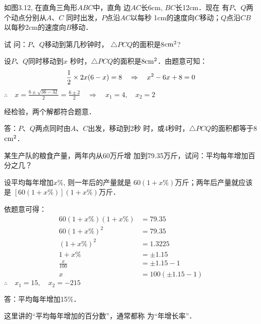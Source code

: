 \begin{example}
    如图3.12, 在直角三角形$ABC$中，直角
    边$AC$长6cm, $BC$长12cm．现在
    有$P$、$Q$两个动点分别从$A$、$C$
    同时出发，$P$点沿$AC$以每秒
    1cm的速度向$C$移动；$Q$点沿$CB$
    以每秒2cm的速度向$B$移动．
    
    试
    问：$P$、$Q$移动到第几秒钟时，
    $\triangle PCQ$的面积是8${\rm cm^2}$?
\end{example}

\begin{figure}[htp]
    \begin{center}
    \end{center}
    \caption{}
\end{figure}



\begin{solution}
设$P$、$Q$同时移动到$x$
秒时，$\triangle PCQ$的面积是8${\rm cm^2}$．由题意可知：
\[\dfrac{1}{2}\times 2x(6-x)=8\quad \Rightarrow\quad x^2-6x+8=0\]
$\therefore\quad x=\frac{6\pm\sqrt{36-32}}{2}=\frac{6\pm 2}{2}\quad\Rightarrow\quad x_1=4,\quad x_2=2$

经检验，两个解都符合题意．

答：$P$、$Q$两点同时由$A$、$C$出发，移动到2秒
时，或4秒时，$\triangle PCQ$的面积都等于8${\rm cm^2}$．
\end{solution}

\begin{example}
某生产队的粮食产量，两年内从60万斤增
加到79.35万斤，试问：平均每年增加百分之几？

\end{example}

\begin{solution}
设平均每年增加$x\%$, 则一年后的产量就是
$60(1+x\%)$万斤；两年后产量就应该是
$[60(1+x\%)](1+x\%)$万斤．

依题意可得：    
\[\begin{split}
    60(1+x\%)(1+x\%)&=79.35\\
60(1+x\%)^2&=79.35\\
(1+x\%)^2&=1.3225\\
1+x\%&=\pm 1.15\\
\frac{x}{100}&=\pm 1.15-1\\
x&=100(\pm 1.15-1)
\end{split}\]
$\therefore\quad x_1=15,\quad x_2=-215$

答：平均每年增加15\%．

这里讲的“平均每年增加的百分数”，通常都称
为“年增长率”．
\end{solution}

